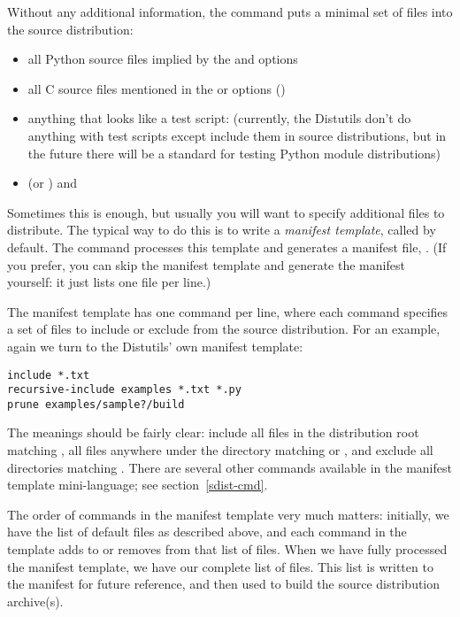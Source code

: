 \documentclass{howto}
\begin{document}
Without any additional information, the  command puts a
minimal set of files into the source distribution:
\begin{itemize}
\item all Python source files implied by the  and
   options
\item all C source files mentioned in the  or
   options ()
\item anything that looks like a test script: 
  (currently, the Distutils don't do anything with test scripts except
  include them in source distributions, but in the future there will be
  a standard for testing Python module distributions)
\item {} (or ) and 
\end{itemize}
Sometimes this is enough, but usually you will want to specify
additional files to distribute.  The typical way to do this is to write
a \emph{manifest template}, called  by default.  The
 command processes this template and generates a manifest
file, .  (If you prefer, you can skip the manifest
template and generate the manifest yourself: it just lists one file per
line.)

The manifest template has one command per line, where each command
specifies a set of files to include or exclude from the source
distribution.  For an example, again we turn to the Distutils' own
manifest template:
\begin{verbatim}
include *.txt
recursive-include examples *.txt *.py
prune examples/sample?/build
\end{verbatim}
The meanings should be fairly clear: include all files in the
distribution root matching , all files anywhere under the
 directory matching  or , and
exclude all directories matching .  There
are several other commands available in the manifest template
mini-language; see section~\ref{sdist-cmd}.

The order of commands in the manifest template very much matters:
initially, we have the list of default files as described above, and
each command in the template adds to or removes from that list of files.
When we have fully processed the manifest template, we have our complete
list of files.  This list is written to the manifest for future
reference, and then used to build the source distribution archive(s).
\end{document}
